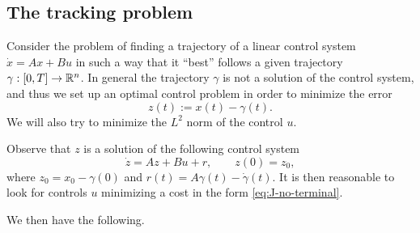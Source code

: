 \subsection{The tracking problem}

Consider the problem of finding a trajectory of a linear control system $\dot x = Ax + Bu$ in such a way that it ``best'' follows a given trajectory $\gamma:[0,T]\to \mathbb{R}^n$. 
In general the trajectory $\gamma$ is not a solution of the control system, and thus we set up an optimal control problem in order to minimize the error 
\begin{equation}
    z(t) := x(t)-\gamma(t).
\end{equation}
We will also try to minimize the $L^2$ norm of the  control $u$.


Observe that $z$ is a solution of the following control system
\begin{equation}
    \label{eq:z-system}
    \dot z = A z + Bu + r, \qquad z(0) = z_0,
\end{equation}
where $z_0 = x_0-\gamma(0)$ and $r(t) = A\gamma(t)-\dot\gamma(t)$. It is then reasonable to look for controls $u$ minimizing a cost in the form \eqref{eq:J-no-terminal}. 
% 


We then have the following.


